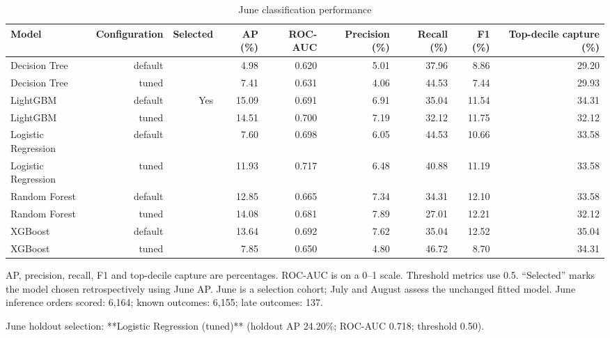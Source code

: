 \begin{table}[htbp]
\centering
\small
\caption{June classification performance}
\begin{tabular}{lrrrrrrrr}
\toprule
Model & Configuration & Selected & AP (\%) & ROC-AUC & Precision (\%) & Recall (\%) & F1 (\%) & Top-decile capture (\%) \\
\midrule
Decision Tree & default &  & 4.98 & 0.620 & 5.01 & 37.96 & 8.86 & 29.20 \\
Decision Tree & tuned &  & 7.41 & 0.631 & 4.06 & 44.53 & 7.44 & 29.93 \\
LightGBM & default & Yes & 15.09 & 0.691 & 6.91 & 35.04 & 11.54 & 34.31 \\
LightGBM & tuned &  & 14.51 & 0.700 & 7.19 & 32.12 & 11.75 & 32.12 \\
Logistic Regression & default &  & 7.60 & 0.698 & 6.05 & 44.53 & 10.66 & 33.58 \\
Logistic Regression & tuned &  & 11.93 & 0.717 & 6.48 & 40.88 & 11.19 & 33.58 \\
Random Forest & default &  & 12.85 & 0.665 & 7.34 & 34.31 & 12.10 & 33.58 \\
Random Forest & tuned &  & 14.08 & 0.681 & 7.89 & 27.01 & 12.21 & 32.12 \\
XGBoost & default &  & 13.64 & 0.692 & 7.62 & 35.04 & 12.52 & 35.04 \\
XGBoost & tuned &  & 7.85 & 0.650 & 4.80 & 46.72 & 8.70 & 34.31 \\
\bottomrule
\end{tabular}
\par\smallskip\begin{minipage}{\linewidth}\footnotesize AP, precision, recall, F1 and top-decile capture are percentages. ROC-AUC is on a 0–1 scale. Threshold metrics use 0.5. “Selected” marks the model chosen retrospectively using June AP. June is a selection cohort; July and August assess the unchanged fitted model. June inference orders scored: 6,164; known outcomes: 6,155; late outcomes: 137.\end{minipage}
\end{table}
June holdout selection: **Logistic Regression (tuned)** (holdout AP 24.20\%; ROC-AUC 0.718; threshold 0.50).

